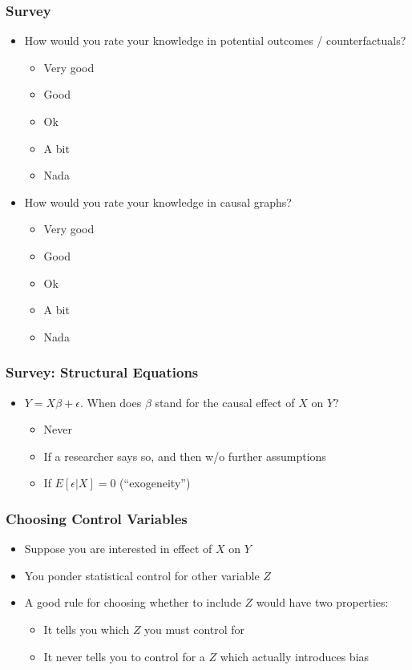 \documentclass{beamer}
\begin{document}
\begin{frame}
\frametitle{Survey}
\begin{itemize}
	\item<1-> How would you rate your knowledge in potential outcomes / counterfactuals?
	\begin{itemize}
		\item<2-> Very good
		\item<2-> Good
		\item<2-> Ok
		\item<2-> A bit
		\item<2-> Nada
	\end{itemize}
	\item<2-> How would you rate your knowledge in causal graphs?
\begin{itemize}
	\item<3-> Very good
	\item<3-> Good
	\item<3-> Ok
	\item<3-> A bit
	\item<3-> Nada
\end{itemize}
\end{itemize}
\end{frame}

\begin{frame}
\frametitle{Survey: Structural Equations}
\begin{itemize}
	\item<1-> $Y = X\beta + \epsilon$. When does $\beta$ stand for the causal effect of $X$ on $Y$?
	\begin{itemize}
	\item<2-> Never
	\item<3-> If a researcher says so, and then w/o further assumptions
	\item<4-> If $E[\epsilon|X] = 0$ (``exogeneity'')
	\end{itemize}
\end{itemize}
\end{frame}


\begin{frame}
\frametitle{Choosing Control Variables}
\begin{itemize}
	\item<1-> Suppose you are interested in effect of $X$ on $Y$
	\item<2-> You ponder statistical control for other variable $Z$
	\item<3-> A good rule for choosing whether to include $Z$ would have two properties:
	\begin{itemize}
		\item<4-> It tells you which $Z$ you must control for
		\item<5-> It never tells you to control for a $Z$ which actually introduces bias
	\end{itemize}
\end{itemize}
\end{frame}
\end{document}
